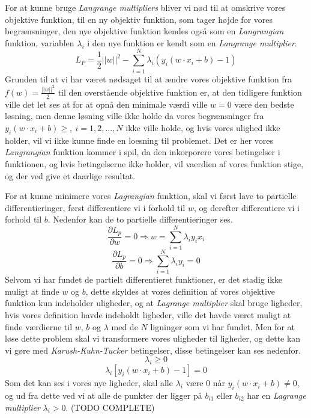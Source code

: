 \documentclass{article}
\begin{document}
For at kunne bruge \textit{Langrange multipliers} bliver vi nød til at omskrive vores objektive funktion, til en ny objektiv funktion, som tager højde for vores begrænsninger, den nye objektive funktion kendes også som en \textit{Langrangian} funktion, variablen $\lambda_i$ i den nye funktion er kendt som en \textit{Langrange multiplier}. 
$$L_P = \frac{1}{2}||w||^2 - \sum\limits_{i=1}^N \lambda_i (y_i(w \cdot x_i + b) - 1)$$
Grunden til at vi har været nødsaget til at ændre vores objektive funktion fra $f(w) = \frac{||w||^2}{2}$ til den overstående objektive funktion er, at den tidligere funktion ville det let ses at for at opnå den minimale værdi ville $w = 0$ være den bedste løsning, men denne løsning ville ikke holde da vores begrænsninger fra $y_i(w \cdot x_i + b) \geq, \ i =1,2,...,N$ ikke ville holde, og hvis vores ulighed ikke holder, vil vi ikke kunne finde en loesning til problemet. Det er her vores \textit{Langrangian} funktion kommer i spil, da den inkorporere vores betingelser i funktionen, og hvis betingelserne ikke holder, vil vaerdien af vores funktion stige, og der ved give et daarlige resultat.

For at kunne minimere vores \textit{Lagrangian} funktion, skal vi først lave to partielle differentieringer, først differentiere vi i forhold til $w$, og derefter differentiere vi i forhold til $b$. Nedenfor kan de to partielle differentieringer ses.
$$\frac{\partial L_p}{\partial w} = 0 \Rightarrow w = \sum\limits_{i=1}^N \lambda_i y_i x_i$$
$$\frac{\partial L_p}{\partial b} = 0 \Rightarrow \sum\limits_{i=1}^N \lambda_i y_i = 0$$
Selvom vi har fundet de partielt differentieret funktioner, er det stadig ikke muligt at finde $w$ og $b$, dette skyldes at vores definition af vores objektive funktion kun indeholder uligheder, og at \textit{Lagrange multiplier} skal bruge ligheder, hvis vores definition havde indeholdt ligheder, ville det havde været muligt at finde værdierne til $w$, $b$ og $\lambda$ med de $N$ ligninger som vi har fundet. Men for at løse dette problem skal vi transformere vores uligheder til ligheder, og dette kan vi gøre med \textit{Karush-Kuhn-Tucker} betingelser, disse betingelser kan ses nedenfor.
$$\lambda_i \geq 0$$
$$\lambda_i[y_i(w \cdot x_i + b) - 1] = 0$$
Som det kan ses i vores nye ligheder, skal alle $\lambda_i$ være $0$ når $y_i(w \cdot x_i + b) \neq 0$, og ud fra dette ved vi at alle de punkter der ligger på $b_{i1}$ eller $b_{i2}$ har en \textit{Lagrange multiplier} $\lambda_i > 0$.  (TODO COMPLETE)
\end{document}
